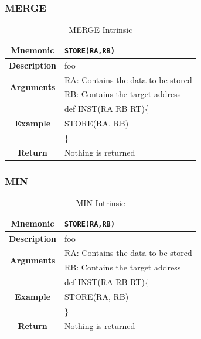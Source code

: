 \documentclass{article}
\begin{document}
\clearpage
\subsubsection{MERGE}
\label{sec:MERGE}

\begin{table}[h]
\begin{center}
\caption{MERGE Intrinsic}
\vspace{0.125in}
\label{tab:MERGEIntrinsic}
\begin{tabular}{|c|l|}
\hline
\textbf{Mnemonic} & \texttt{STORE(RA,RB)}\\
\hline
\textbf{Description} & foo\\
\hline
\multirow{2}{*}{\textbf{Arguments}} & RA: Contains the data to be stored\\
                          			     & RB: Contains the target address \\
\hline
\multirow{3}{*}{\textbf{Example}} & def INST(RA RB RT)\{\\
                          			  &   STORE(RA, RB)\\
                                                    & \}\\
\hline
\textbf{Return} & Nothing is returned\\                                                    
\hline
\end{tabular}
\end{center}
\end{table}

\clearpage
\subsubsection{MIN}
\label{sec:MIN}

\begin{table}[h]
\begin{center}
\caption{MIN Intrinsic}
\vspace{0.125in}
\label{tab:MINIntrinsic}
\begin{tabular}{|c|l|}
\hline
\textbf{Mnemonic} & \texttt{STORE(RA,RB)}\\
\hline
\textbf{Description} & foo\\
\hline
\multirow{2}{*}{\textbf{Arguments}} & RA: Contains the data to be stored\\
                          			     & RB: Contains the target address \\
\hline
\multirow{3}{*}{\textbf{Example}} & def INST(RA RB RT)\{\\
                          			  &   STORE(RA, RB)\\
                                                    & \}\\
\hline
\textbf{Return} & Nothing is returned\\                                                    
\hline
\end{tabular}
\end{center}
\end{table}
\end{document}
